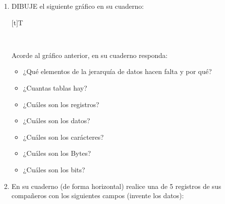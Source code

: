 \documentclass[letterpaper,10pt,spanish]{sphinxmanual}
\let\sphinxpxdimen\pdfpxdimen\else\newdimen\sphinxpxdimen
\begin{document}
\begin{enumerate}
%
\setcounter{enumi}{5}
\item {} 
\sphinxAtStartPar
DIBUJE el siguiente gráfico en su cuaderno:


\begin{savenotes}\sphinxattablestart
\sphinxthistablewithglobalstyle
\centering
\begin{tabulary}{\linewidth}[t]{T}
\sphinxtoprule
\sphinxtableatstartofbodyhook

\begin{sphinxfigure-in-table}
\centering
\capstart
\noindent\sphinxincludegraphics[width=550\sphinxpxdimen]{{image0212}.png}
\label{\detokenize{1_guias/8logica/G822:id12}}\end{sphinxfigure-in-table}\relax
\\
\sphinxbottomrule
\end{tabulary}
\sphinxtableafterendhook\par
\sphinxattableend\end{savenotes}

\sphinxAtStartPar
Acorde al gráfico anterior, en su cuaderno responda:
\begin{itemize}
\item {} 
\sphinxAtStartPar
¿Qué elementos de la jerarquía de datos hacen falta y por qué?

\item {} 
\sphinxAtStartPar
¿Cuantas tablas hay?

\item {} 
\sphinxAtStartPar
¿Cuáles son los registros?

\item {} 
\sphinxAtStartPar
¿Cuáles son los datos?

\item {} 
\sphinxAtStartPar
¿Cuáles son los carácteres?

\item {} 
\sphinxAtStartPar
¿Cuáles son los Bytes?

\item {} 
\sphinxAtStartPar
¿Cuáles son los bits?

\end{itemize}

\item {} 
\sphinxAtStartPar
En su cuaderno (de forma horizontal) realice una  de 5 registros de sus compañeros con los siguientes campos (invente los datos):

\end{enumerate}
\end{document}

